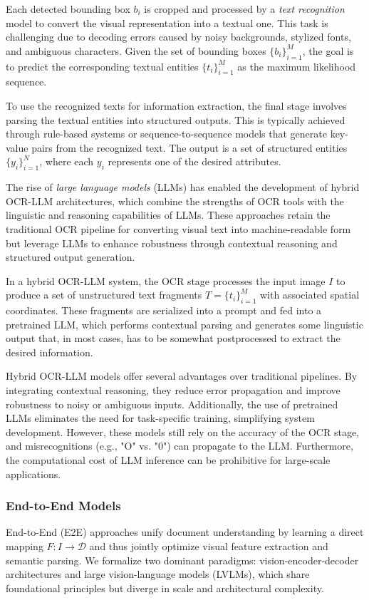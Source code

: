 \documentclass[11pt]{article}
\begin{document}
Each detected bounding box $ b_i $ is cropped and processed by a \emph{text recognition} model to convert the visual representation into a textual one. This task is challenging due to decoding errors caused by noisy backgrounds, stylized fonts, and ambiguous characters. Given the set of bounding boxes $ \{b_i\}_{i=1}^{M} $, the goal is to predict the corresponding textual entities $ \{t_i\}_{i=1}^{M} $ as the maximum likelihood sequence.

To use the recognized texts for information extraction, the final stage involves parsing the textual entities into structured outputs. This is typically achieved through rule-based systems or sequence-to-sequence models that generate key-value pairs from the recognized text. The output is a set of structured entities $ \{y_i\}_{i=1}^{N} $, where each $ y_i $ represents one of the desired attributes.

The rise of \emph{large language models }(LLMs) has enabled the development of hybrid OCR-LLM architectures, which combine the strengths of OCR tools with the linguistic and reasoning capabilities of LLMs. These approaches retain the traditional OCR pipeline for converting visual text into machine-readable form but leverage LLMs to enhance robustness through contextual reasoning and structured output generation.

In a hybrid OCR-LLM system, the OCR stage processes the input image $ I $ to produce a set of unstructured text fragments $ T = \{t_i\}_{i=1}^{M} $ with associated spatial coordinates. These fragments are serialized into a prompt and fed into a pretrained LLM, which performs contextual parsing and generates some linguistic output that, in most cases, has to be somewhat postprocessed to extract the desired information.

Hybrid OCR-LLM models offer several advantages over traditional pipelines. By integrating contextual reasoning, they reduce error propagation and improve robustness to noisy or ambiguous inputs. Additionally, the use of pretrained LLMs eliminates the need for task-specific training, simplifying system development. However, these models still rely on the accuracy of the OCR stage, and misrecognitions (e.g., "O" vs. "0") can propagate to the LLM. Furthermore, the computational cost of LLM inference can be prohibitive for large-scale applications.

\subsubsection{End-to-End Models}  
End-to-End (E2E) approaches unify document understanding by learning a direct mapping $ F: I \to \mathcal{D} $ and thus jointly optimize visual feature extraction and semantic parsing. We formalize two dominant paradigms: vision-encoder-decoder architectures and large vision-language models (LVLMs), which share foundational principles but diverge in scale and architectural complexity.
\end{document}
